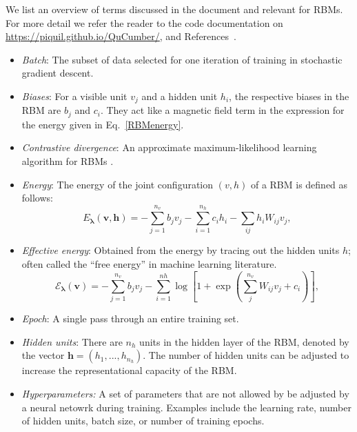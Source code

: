 \documentclass[submission, Phys, hidelnks]{SciPost}
\begin{document}
We list an overview of terms discussed in the document and relevant for RBMs. For more detail we refer the reader to the code documentation on \url{https://piquil.github.io/QuCumber/}, and References~\cite{hinton2002training, hinton2012practical}.

\begin{itemize}

\item {\it Batch}: The subset of data selected for one iteration of training in stochastic gradient descent.

\item {\it Biases}: For a visible unit $v_j$ and a hidden unit $h_i$, the respective biases in the RBM are $b_j$ and $c_i$. They act like a magnetic field term in the expression for the energy given in Eq.~\eqref{RBMenergy}.

\item {\it Contrastive divergence}: An approximate maximum-likelihood learning algorithm for RBMs \cite{hinton2002training}.

\item {\it Energy}: The energy of the joint configuration $(v, h)$ of a RBM is defined as follows:
\begin{equation}
   E_{\bm{\lambda}}(\bm{v},\bm{h}) = - \sum\limits_{j=1}^{n_v} b_j v_j - \sum\limits_{i=1}^{n_h} c_i h_i - \sum\limits_{ij} h_i W_{ij} v_j, \label{RBMenergy}
\end{equation}

\item {\it Effective energy}: Obtained from the energy by tracing out the hidden units $h$; often called the ``free energy'' in machine learning literature.
\begin{equation}
   \mathcal{E}_{\bm{\lambda}}(\bm{v}) = - \sum\limits_{j=1}^{n_v} b_j v_j - \sum\limits_{i=1}^{nh} \log \left[ 1 + \exp \left( \sum\limits_{j}^{n_v} W_{ij}v_j +c_i\right) \right], \label{RBMeffectiveenergy}
\end{equation}

\item {\it Epoch}: A single pass through an entire training set.

\item {\it Hidden units}: There are $n_h$ units in the hidden layer of the RBM, denoted by the vector $\bm{h}=(h_1, ..., h_{n_h})$. The number of hidden units can be adjusted to increase the representational capacity of the RBM.

\item{\it Hyperparameters:} A set of parameters that are not allowed by be adjusted by a neural netowrk during training. Examples include the learning rate, number of hidden units, batch size, or number of training epochs.


\end{itemize}
\end{document}
